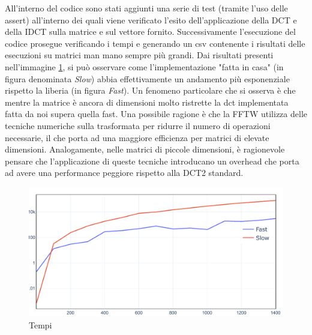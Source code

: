 All'interno del codice sono stati aggiunti una serie di test (tramite l'uso delle assert) all'interno dei quali viene verificato l'esito dell'applicazione della DCT e della IDCT sulla matrice e sul vettore fornito. Successivamente l'esecuzione del codice prosegue verificando i tempi e generando un csv contenente i risultati delle esecuzioni su matrici man mano sempre più grandi. Dai risultati presenti nell'immagine \ref{fig:timings}, si può osservare come l'implementazione "fatta in casa" (in figura denominata \textit{Slow}) abbia effettivamente un andamento più esponenziale rispetto la liberia (in figura \textit{Fast}). Un fenomeno particolare che si osserva è che mentre la matrice è ancora di dimensioni molto ristrette la dct implementata fatta da noi supera quella fast. Una possibile ragione è che la FFTW utilizza delle tecniche numeriche sulla trasformata per ridurre il numero di operazioni necessarie, il che porta ad una maggiore efficienza per matrici di elevate dimensioni. Analogamente, nelle matrici di piccole dimensioni, è ragionevole pensare che l'applicazione di queste tecniche introducano un overhead che porta ad avere una performance peggiore rispetto alla DCT2 standard.

\begin{figure}[ht]
	\centering
	\label{fig:timings}	
	\includegraphics[scale=0.7]{figures/timings}
	\caption{Tempi}
\end{figure}

\FloatBarrier